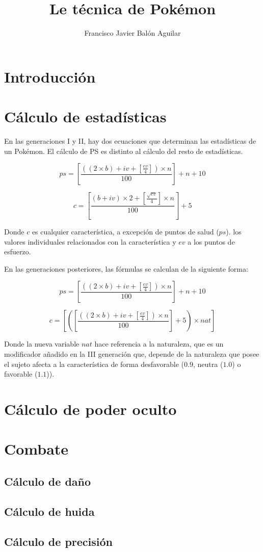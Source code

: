 \documentclass[a4paper, 11pt, titlepage]{article}
\title{Le técnica de Pokémon}
\author{Francisco Javier Balón Aguilar}
\begin{document}
\maketitle
\renewcommand{\contentsname}{Índice}
\tableofcontents
\newpage

\section{Introducción}\label{introduccion}

\section{Cálculo de estadísticas}

    En las generaciones I y II, hay dos ecuaciones que determinan las estadísticas 
    de un Pokémon. El cálculo de PS es distinto al cálculo del resto de estadísticas.

    \[
        ps = [\frac{((2 \times b) + iv + [\frac{ev}{4}]) \times n}{100}] + n + 10
    \]

    \[
        c = [\frac{(b + iv) \times 2 + [\frac{\sqrt{ev}}{4}] \times n}{100}] + 5    
    \]

    Donde $c$ es cualquier característica, a excepción de puntos de salud ($ps$).
    los valores individuales relacionados con la característica y $ev$ a los puntos 
    de esfuerzo.

    En las generaciones posteriores, las fórmulas se calculan de la siguiente forma:

    \[
        ps = [\frac{((2 \times b) + iv + [\frac{ev}{4}]) \times n}{100}] + n + 10    
    \]

    \[
        c = [([\frac{((2 \times b) + iv + [\frac{ev}{4}]) \times n}{100}] + 5) \times nat]    
    \]

    Donde la nueva variable $nat$ hace referencia a la naturaleza, que es un modificador 
    añadido en la III generación que, depende de la naturaleza que posee el sujeto afecta a 
    la característica de forma desfavorable ($0.9$, neutra ($1.0$) o favorable ($1.1$)).

\section{Cálculo de poder oculto}

\section{Combate}

    \subsection{Cálculo de daño}

    \subsection{Cálculo de huida}

    \subsection{Cálculo de precisión}
\end{document}
